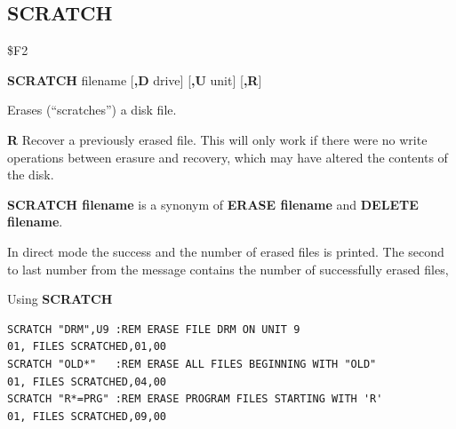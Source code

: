 \subsection{SCRATCH}
\begin{description}[leftmargin=2cm,style=nextline]
\item [Token:] \$F2
\item [Format:] {\bf SCRATCH} filename [{\bf,D} drive] [{\bf,U} unit] [{\bf,R}]
\item [Usage:] Erases (``scratches'') a disk file.

   \filenamedefinition

   \drivedefinition

   \unitdefinition

   {\bf R} Recover a previously erased file.
   This will only work if there were no write operations
   between erasure and recovery, which may have altered the
   contents of the disk.

\item [Remarks:] {\bf SCRATCH filename} is a synonym of {\bf ERASE filename}
                 and {\bf DELETE filename}.

   In direct mode the success and the number of erased files is printed.
                 The second to last number from the message
                 contains the number of successfully erased files,

\item [Examples:] Using {\bf SCRATCH}
\begin{tcolorbox}[colback=black,coltext=white]
\verbatimfont{\codefont}
\begin{verbatim}
SCRATCH "DRM",U9 :REM ERASE FILE DRM ON UNIT 9
01, FILES SCRATCHED,01,00
SCRATCH "OLD*"   :REM ERASE ALL FILES BEGINNING WITH "OLD"
01, FILES SCRATCHED,04,00
SCRATCH "R*=PRG" :REM ERASE PROGRAM FILES STARTING WITH 'R'
01, FILES SCRATCHED,09,00
\end{verbatim}
\end{tcolorbox}
\end{description}


\newpage
